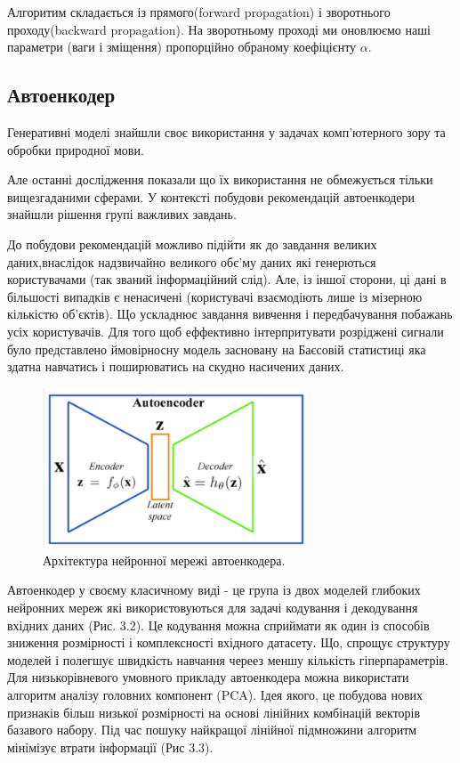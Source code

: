 Алгоритим складається із прямого(forward propagation) і зворотнього проходу(backward propagation). На зворотньому проході ми оновлюємо наші параметри (ваги і зміщення) пропорційно обраному коефіцієнту $\alpha$.

\subsection{Автоенкодер}

Генеративні моделі знайшли своє використання у задачах
комп’ютерного зору та обробки природної мови.

Але останні дослідження показали що їх використання не обмежується тільки вищезгаданими сферами. У контексті побудови рекомендацій автоенкодери знайшли рішення групі важливих завдань.

До побудови рекомендацій можливо підійти як до завдання великих даних,внаслідок надзвичайно великого обє’му даних які генерються користувачами (так званий інформаційний слід). Але, із іншої сторони, ці дані в більшості випадків є ненасичені (користувачі взаємодіють лише із мізерною кількістю об’єктів). Що ускладнює завдання вивчення і передбачування побажань усіх користувачів. Для того щоб еффективно інтерпритувати розріджені сигнали було представлено ймовірносну модель засновану на Баєсовій статистиці яка здатна навчатись і поширюватись на скудно насичених даних.

\begin{figure}
    \centering
    \includegraphics[width=0.7\textwidth]{images/Autoencoder.png}
    \caption{Архітектура нейронної мережі автоенкодера.}
\end{figure}
Автоенкодер у своєму класичному виді - це група із двох моделей глибоких нейронних мереж які використовуються для задачі кодування і декодування вхідних даних (Рис. 3.2).
Це кодування можна сприймати як один із способів зниження розмірності і комплексності вхідного датасету. Що, спрощує структуру моделей і полегшує швидкість навчання череез меншу кількість гіперпараметрів. Для низькорівневого умовного прикладу автоенкодера можна використати  алгоритм аналізу головних компонент (PCA). Ідея якого, це побудова нових признаків більш низької розмірності на основі лінійних комбінацій векторів базавого набору. Під час пошуку найкращої лінійної підмножини алгоритм мінімізує втрати інформації (Рис 3.3).


